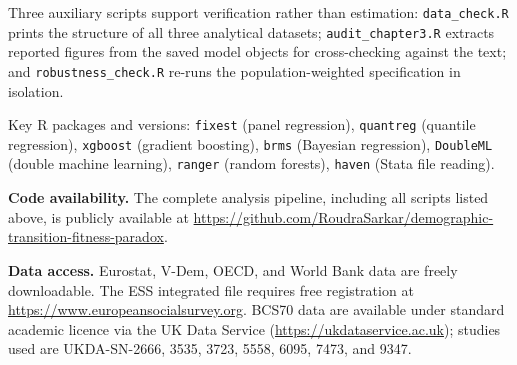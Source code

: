 \documentclass[12pt,a4paper]{report}
\begin{document}
\noindent Three auxiliary scripts support verification rather than estimation:
\texttt{data\_check.R} prints the structure of all three analytical datasets;
\texttt{audit\_chapter3.R} extracts reported figures from the saved model objects for cross-checking against the text; and
\texttt{robustness\_check.R} re-runs the population-weighted specification in isolation.

\noindent Key R packages and versions: \texttt{fixest} (panel regression), \texttt{quantreg}
(quantile regression), \texttt{xgboost} (gradient boosting), \texttt{brms} (Bayesian regression),
\texttt{DoubleML} (double machine learning), \texttt{ranger} (random forests), \texttt{haven}
(Stata file reading).

\noindent\textbf{Code availability.} The complete analysis pipeline, including all scripts listed
above, is publicly available at
\url{https://github.com/RoudraSarkar/demographic-transition-fitness-paradox}.

\noindent\textbf{Data access.} Eurostat, V-Dem, OECD, and World Bank data are freely downloadable.
The ESS integrated file requires free registration at
\url{https://www.europeansocialsurvey.org}. BCS70 data are available under standard academic
licence via the UK Data Service (\url{https://ukdataservice.ac.uk}); studies used are
UKDA-SN-2666, 3535, 3723, 5558, 6095, 7473, and 9347.


\end{document}
